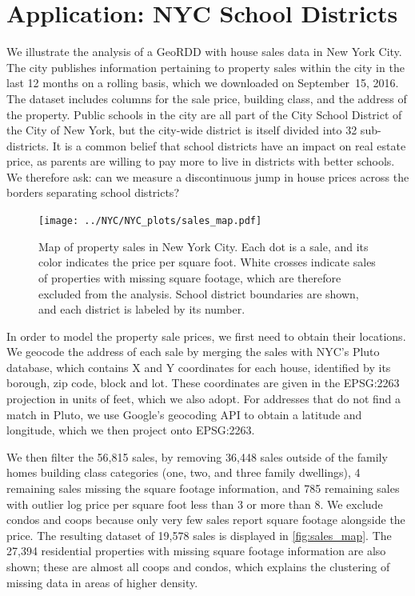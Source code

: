 \section{Application: NYC School Districts}
\label{sec:NYC_example}

We illustrate the analysis of a GeoRDD with house sales data in New York City.
The city publishes information pertaining to property sales within the city in the last 12 months on a rolling basis,
which we downloaded on September~15, 2016.
The dataset includes columns for the sale price, building class, and the address of the property.
Public schools in the city are all part of the City School District of the City of New York, but the city-wide district is itself divided into 32 sub-districts.
It is a common belief that school districts have an impact on real estate price, as parents are willing to pay more to live in districts with better schools.
We therefore ask: can we measure a discontinuous jump in house prices across the borders separating school districts?

\begin{figure}[tb]
    \centering
    \texttt{[image: ../NYC/NYC\_plots/sales\_map.pdf]}
    \caption{\label{fig:sales_map}Map of property sales in New York City. Each dot is a sale, and its color indicates the price per square foot. White crosses indicate sales of properties with missing square footage, which are therefore excluded from the analysis. School district boundaries are shown, and each district is labeled by its number.}
\end{figure}

In order to model the property sale prices, we first need to obtain their locations.
We geocode the address of each sale by merging the sales with NYC's Pluto database, which contains X and Y coordinates for each house, identified by its borough, zip code, block and lot.
These coordinates are given in the EPSG:2263 projection in units of feet, which we also adopt.
For addresses that do not find a match in Pluto, we use Google's geocoding API to obtain a latitude and longitude, which we then project onto EPSG:2263.

We then filter the 56,815 sales, by removing
36,448 sales outside of the family homes building class categories (one, two, and three family dwellings),
4 remaining sales missing the square footage information,
and 785 remaining sales with outlier log price per square foot less than 3 or more than 8.
We exclude condos and coops because only very few sales report square footage alongside the price.
The resulting dataset of 19,578 sales is displayed in \autoref{fig:sales_map}.
The 27,394 residential properties with missing square footage information are also shown;
these are almost all coops and condos, which explains the clustering of missing data in areas of higher density.

